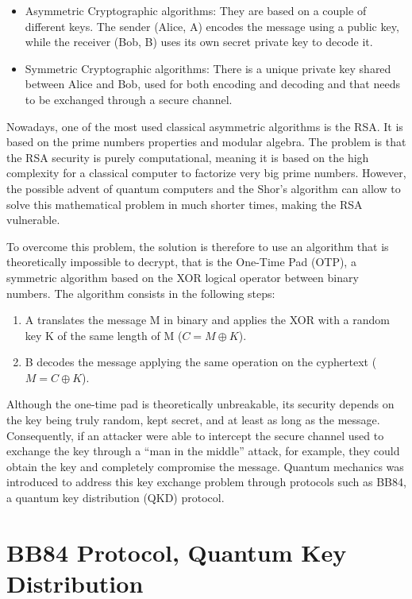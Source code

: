 \documentclass[10pt,letterpaper]{report}
\begin{document}
\begin{itemize}
    \item Asymmetric Cryptographic algorithms: They are based on a couple of different keys. The sender (Alice, A) encodes the message using a public key, while the receiver (Bob, B) uses its own secret private key to decode it.
    \item Symmetric Cryptographic algorithms: There is a unique private key shared between Alice and Bob, used for both encoding and decoding and that needs to be exchanged through a secure channel.
\end{itemize}

Nowadays, one of the most used classical asymmetric algorithms is the RSA. It is based on the prime numbers properties and modular algebra.
The problem is that the RSA security is purely computational, meaning it is based on the high complexity for a classical computer to factorize very big prime numbers. However, the possible advent of quantum computers and the Shor's algorithm can allow to solve this mathematical problem in much shorter times, making the RSA vulnerable.

To overcome this problem, the solution is therefore to use an algorithm that is theoretically impossible to decrypt, that is the One-Time Pad (OTP), a symmetric algorithm based on the XOR logical operator between binary numbers. The algorithm consists in the following steps:

\begin{enumerate}
    \item A translates the message M in binary and applies the XOR with a random key K of the same length of M ($C = M \oplus K$).
    \item B decodes the message applying the same operation on the cyphertext ($M = C \oplus K$).
\end{enumerate}

Although the one-time pad is theoretically unbreakable, its security depends on the key being truly random, kept secret, and at least as long as the message. Consequently, if an attacker were able to intercept the secure channel used to exchange the key through a ``man in the middle'' attack, for example, they could obtain the key and completely compromise the message. 
Quantum mechanics was introduced to address this key exchange problem through protocols such as BB84, a quantum key distribution (QKD) protocol.


\section{BB84 Protocol, Quantum Key Distribution}
\end{document}
